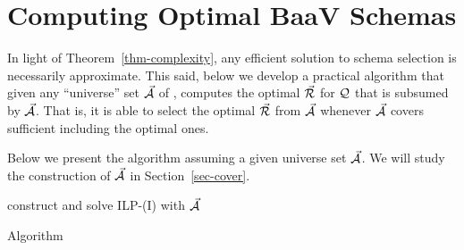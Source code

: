 \vspace{2ex}
\section{Computing Optimal \textsf{BaaV} Schemas}
\label{sec-select}

In light of Theorem~\ref{thm-complexity}, any efficient solution
to \baav schema selection is necessarily approximate.
This said, below we develop a practical algorithm 
that given any ``universe'' set $\vec{{\mathcal A}}$ of \bss,
computes the optimal \bds $\vec{{\mathcal R}}$ for $\mathcal Q$ that is subsumed by
$\vec{{\mathcal A}}$. That is, it is able to select the optimal $\vec{{\mathcal R}}$
from  $\vec{{\mathcal A}}$ whenever $\vec{{\mathcal A}}$ covers sufficient \bss
including the optimal ones.


Below we present the algorithm assuming a given universe set $\vec{{\mathcal A}}$.
We will study the construction of $\vec{{\mathcal A}}$ in
Section~\ref{sec-cover}.



\begin{myfloat}[t]
\vspace{1.2ex}
\begin{minipage}{0.50\textwidth}
  \removelatexerror
{\scriptsize
\setlength{\floatsep}{0cm} %
\setlength{\textfloatsep}{-2cm}%
\IncMargin{1em}
\vspace{-0.7ex}
\begin{algorithm}[H]
\Indentp{-2ex}
{}
\Indentp{1em}
\BlankLine
construct and solve ILP-(I) with
$\vec{{\mathcal A}}$\label{opts-l1}
\caption{Algorithm \opts\label{alg-opts}} 
\end{algorithm}
\DecMargin{1em}
}
\end{minipage}
\vspace{-2.4ex}
\end{myfloat}


